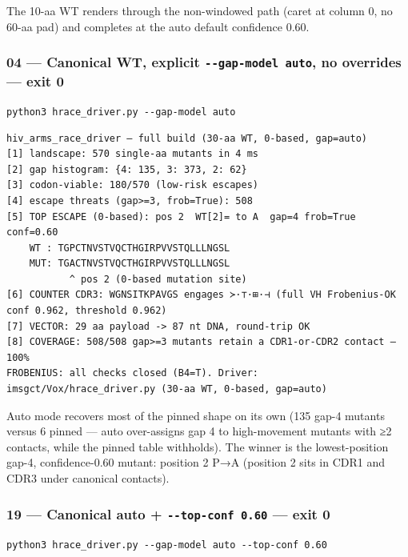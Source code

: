 The 10-aa WT renders through the non-windowed path (caret at column 0,
no 60-aa pad) and completes at the auto default confidence 0.60.

\hypertarget{canonical-wt-explicit---gap-model-auto-no-overrides-exit-0}{%
\subsubsection{\texorpdfstring{04 --- Canonical WT, explicit
\texttt{-\/-gap-model\ auto}, no overrides --- exit
0}{04 --- Canonical WT, explicit -\/-gap-model auto, no overrides --- exit 0}}\label{canonical-wt-explicit---gap-model-auto-no-overrides-exit-0}}

\texttt{python3\ hrace\_driver.py\ -\/-gap-model\ auto}

\begin{verbatim}
hiv_arms_race_driver — full build (30-aa WT, 0-based, gap=auto)
[1] landscape: 570 single-aa mutants in 4 ms
[2] gap histogram: {4: 135, 3: 373, 2: 62}
[3] codon-viable: 180/570 (low-risk escapes)
[4] escape threats (gap>=3, frob=True): 508
[5] TOP ESCAPE (0-based): pos 2  WT[2]= to A  gap=4 frob=True conf=0.60
    WT : TGPCTNVSTVQCTHGIRPVVSTQLLLNGSL
    MUT: TGACTNVSTVQCTHGIRPVVSTQLLLNGSL
           ^ pos 2 (0-based mutation site)
[6] COUNTER CDR3: WGNSITKPAVGS engages ≻·⊤·⊞·⊣ (full VH Frobenius-OK conf 0.962, threshold 0.962)
[7] VECTOR: 29 aa payload -> 87 nt DNA, round-trip OK
[8] COVERAGE: 508/508 gap>=3 mutants retain a CDR1-or-CDR2 contact — 100%
FROBENIUS: all checks closed (B4=T). Driver: imsgct/Vox/hrace_driver.py (30-aa WT, 0-based, gap=auto)
\end{verbatim}

Auto mode recovers most of the pinned shape on its own (135 gap-4
mutants versus 6 pinned --- auto over-assigns gap 4 to high-movement
mutants with ≥2 contacts, while the pinned table withholds). The winner
is the lowest-position gap-4, confidence-0.60 mutant: position 2 P→A
(position 2 sits in CDR1 and CDR3 under canonical contacts).

\hypertarget{canonical-auto---top-conf-0.60-exit-0}{%
\subsubsection{\texorpdfstring{19 --- Canonical auto +
\texttt{-\/-top-conf\ 0.60} --- exit
0}{19 --- Canonical auto + -\/-top-conf 0.60 --- exit 0}}\label{canonical-auto---top-conf-0.60-exit-0}}

\texttt{python3\ hrace\_driver.py\ -\/-gap-model\ auto\ -\/-top-conf\ 0.60}

